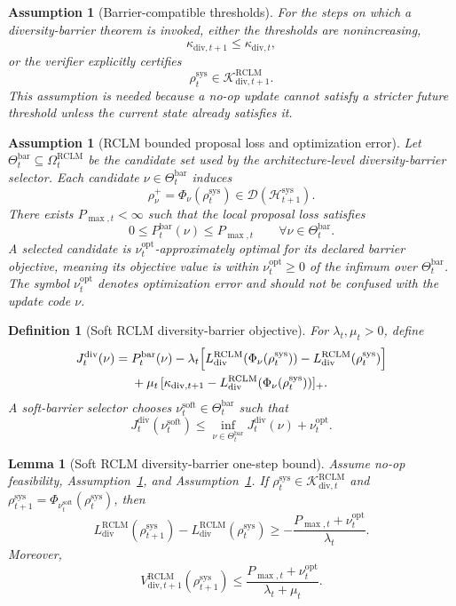 \documentclass[11pt,a4paper]{article}
\newtheorem{lemma}[theorem]{Lemma}
\newtheorem{definition}[theorem]{Definition}
\newtheorem{assumption}[theorem]{Assumption}
\newcommand{\D}{\mathcal D}
\newcommand{\Hcal}{\mathcal H}
\newcommand{\Kcal}{\mathcal K}
\newcommand{\RCLM}{\mathrm{RCLM}}
\newcommand{\sys}{\mathrm{sys}}
\newcommand{\soft}{\mathrm{soft}}
\begin{document}
\begin{assumption}[Barrier-compatible thresholds]
\label{ass:rclm_barrier_threshold_compatibility}
For the steps on which a diversity-barrier theorem is invoked, either the thresholds are nonincreasing,
\[
\kappa_{\mathrm{div},t+1}\le \kappa_{\mathrm{div},t},
\]
or the verifier explicitly certifies
\[
\rho_t^{\sys}\in\Kcal_{\mathrm{div},t+1}^{\RCLM}.
\]
This assumption is needed because a no-op update cannot satisfy a stricter future threshold unless the current state already satisfies it.
\end{assumption}

\begin{assumption}[RCLM bounded proposal loss and optimization error]
\label{ass:rclm_bounded_barrier_loss}
Let \(\Theta_t^{\mathrm{bar}}\subseteq\Omega_t^{\RCLM}\) be the candidate set used by the architecture-level diversity-barrier selector.  Each candidate \(\nu\in\Theta_t^{\mathrm{bar}}\) induces
\[
\rho_\nu^+=\Phi_\nu(\rho_t^{\sys})\in\D(\Hcal_{t+1}^{\sys}).
\]
There exists \(P_{\max,t}<\infty\) such that the local proposal loss satisfies
\[
0\le P_t^{\mathrm{bar}}(\nu)\le P_{\max,t}
\qquad\forall \nu\in\Theta_t^{\mathrm{bar}}.
\]
A selected candidate is \(\nu_t^{\mathrm{opt}}\)-approximately optimal for its declared barrier objective, meaning its objective value is within \(\nu_t^{\mathrm{opt}}\ge0\) of the infimum over \(\Theta_t^{\mathrm{bar}}\).  The symbol \(\nu_t^{\mathrm{opt}}\) denotes optimization error and should not be confused with the update code \(\nu\).
\end{assumption}

\begin{definition}[Soft RCLM diversity-barrier objective]
For \(\lambda_t,\mu_t>0\), define
\[
\begin{aligned}
J_{t}^{\mathrm{div}}(\nu)
={}&P_t^{\mathrm{bar}}(\nu)
-\lambda_t\Bigl[L_{\mathrm{div}}^{\RCLM}(\Phi_\nu(\rho_t^{\sys}))-L_{\mathrm{div}}^{\RCLM}(\rho_t^{\sys})\Bigr]\\
&+\mu_t\,[\kappa_{\mathrm{div},t+1}-L_{\mathrm{div}}^{\RCLM}(\Phi_\nu(\rho_t^{\sys}))]_+ .
\end{aligned}
\]
A soft-barrier selector chooses \(\nu_{t}^{\soft}\in\Theta_t^{\mathrm{bar}}\) such that
\[
J_t^{\mathrm{div}}(\nu_t^{\soft})
\le
\inf_{\nu\in\Theta_t^{\mathrm{bar}}}J_t^{\mathrm{div}}(\nu)+\nu_t^{\mathrm{opt}}.
\]
\end{definition}

\begin{lemma}[Soft RCLM diversity-barrier one-step bound]
\label{lem:rclm_soft_diversity_bound}
Assume no-op feasibility, Assumption~\ref{ass:rclm_barrier_threshold_compatibility}, and Assumption~\ref{ass:rclm_bounded_barrier_loss}.  If \(\rho_t^{\sys}\in\Kcal_{\mathrm{div},t}^{\RCLM}\) and \(\rho_{t+1}^{\sys}=\Phi_{\nu_t^{\soft}}(\rho_t^{\sys})\), then
\[
L_{\mathrm{div}}^{\RCLM}(\rho_{t+1}^{\sys})-L_{\mathrm{div}}^{\RCLM}(\rho_t^{\sys})
\ge
-\frac{P_{\max,t}+\nu_t^{\mathrm{opt}}}{\lambda_t}.
\]
Moreover,
\[
V_{\mathrm{div},t+1}^{\RCLM}(\rho_{t+1}^{\sys})
\le
\frac{P_{\max,t}+\nu_t^{\mathrm{opt}}}{\lambda_t+\mu_t}.
\]
\end{lemma}
\end{document}
